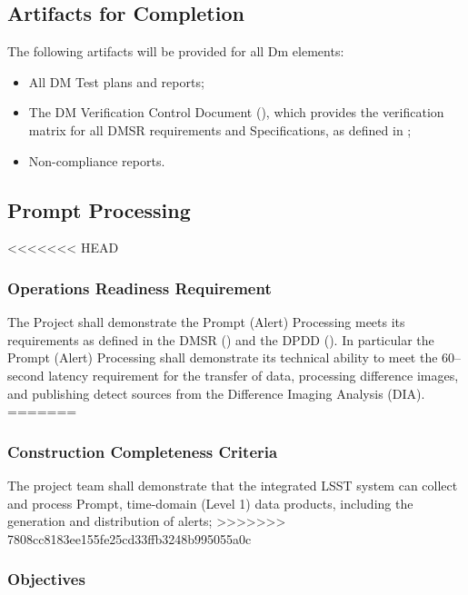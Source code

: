\subsection{Artifacts for Completion}

The following artifacts will be provided for all Dm elements:

\begin{itemize}
	\item All DM Test plans and reports;
	\item The DM Verification Control Document (), which provides the verification matrix for all DMSR requirements and Specifications, as defined in ;
	\item Non-compliance reports.
\end{itemize}


\subsection{Prompt Processing}

<<<<<<< HEAD
\subsubsection{Operations Readiness Requirement}
The Project shall demonstrate the Prompt (Alert) Processing meets its requirements as defined in the DMSR () and the DPDD ().  In particular the Prompt (Alert) Processing shall demonstrate its technical ability to meet the 60--second latency requirement for the transfer of data, processing difference images, and publishing detect sources from the Difference Imaging Analysis (DIA).
=======
\subsubsection{Construction Completeness Criteria}
The project team shall demonstrate that the integrated LSST system can collect and process Prompt, time-domain (Level 1) data products, including the generation and distribution of alerts;
>>>>>>> 7808cc8183ee155fe25cd33ffb3248b995055a0c

\subsubsection{Objectives} 

